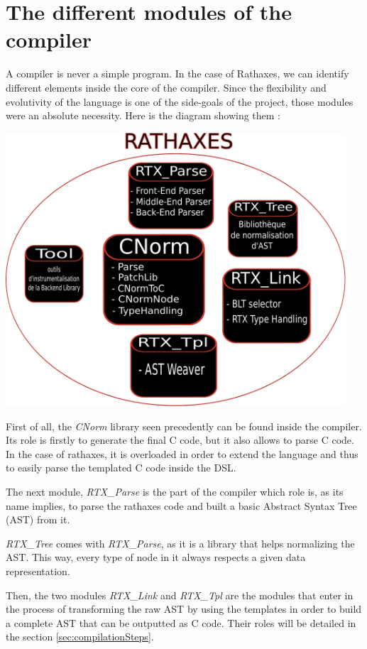 \documentclass{rtxreport}
\begin{document}
\section{The different modules of the compiler}

A compiler is never a simple program. In the case of Rathaxes, we can identify
different elements inside the core of the compiler. Since the flexibility and
evolutivity of the language is one of the side-goals of the project, 
those modules were an absolute necessity. Here is the diagram showing them :

\includegraphics[width=0.95\textwidth]{diagramme_architecture.pdf}

First of all, the \emph{CNorm} library seen precedently can be found inside the
compiler. Its role is firstly to generate the final C code, but it also allows
to parse C code. In the case of rathaxes, it is overloaded in order to extend
the language and thus to easily parse the templated C code inside the DSL.

The next module, \emph{RTX\_Parse} is the part of the compiler which role is,
as its name implies, to parse the rathaxes code and built a basic Abstract
Syntax Tree (AST) from it.

\emph{RTX\_Tree} comes with \emph{RTX\_Parse}, as it is a library that helps
normalizing the AST. This way, every type of node in it always respects a given
data representation.

Then, the two modules \emph{RTX\_Link} and \emph{RTX\_Tpl} are the modules that
enter in the process of transforming the raw AST by using the templates in
order to build a complete AST that can be outputted as C code. Their roles will
be detailed in the section \ref{sec:compilationSteps}.
\end{document}
